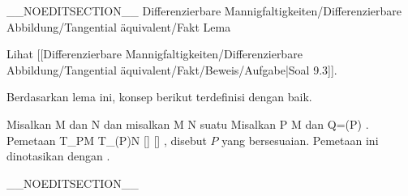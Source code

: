 __NOEDITSECTION__
{Differenzierbare Mannigfaltigkeiten/Differenzierbare Abbildung/Tangential äquivalent/Fakt}
{Lema}
{}
{

\faktzusatz {}
\faktzusatz {}

 }
{ Lihat [[Differenzierbare Mannigfaltigkeiten/Differenzierbare Abbildung/Tangential äquivalent/Fakt/Beweis/Aufgabe|Soal 9.3]]. }

Berdasarkan lema ini, konsep berikut terdefinisi dengan baik.

{}
{

Misalkan
\mathkor {} {M} {dan} {N} {}
dan misalkan
\maabbdisp {\varphi} { M } { N
} {}
suatu
Misalkan
\mathkor {} {P \in M} {dan} {Q=\varphi(P)} {.}
Pemetaan
\maabbeledisp {} {T_PM} {T_{\varphi(P)}N
} { [\gamma] } { [\varphi \circ \gamma]
} {,}
disebut  $P$ yang bersesuaian. Pemetaan ini dinotasikan dengan
.

}

__NOEDITSECTION__

